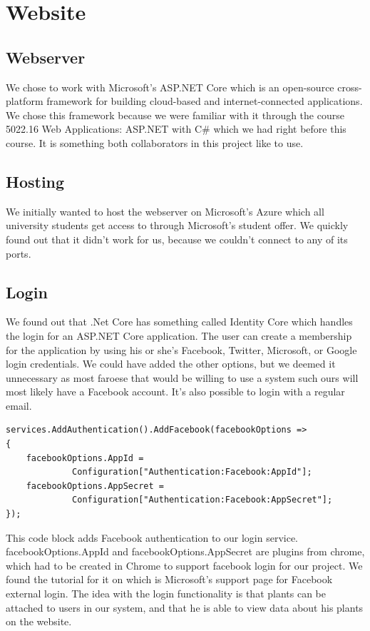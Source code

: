 \documentclass[a4paper,12pt,twoside,openright,titlepage]{book}
\begin{document}
\chapter{Website}
\section*{Webserver}
We chose to work with Microsoft's ASP.NET Core which is an open-source cross-platform framework for building cloud-based and internet-connected applications. We chose this framework because we were familiar with it through the course 5022.16 Web Applications: ASP.NET with C\# which we had right before this course. It is something both collaborators in this project like to use. 

\section{Hosting}
We initially wanted to host the webserver on Microsoft's Azure which all university students get access to through Microsoft's student offer. We quickly found out that it didn't work for us, because we couldn't connect to any of its ports. 

\section{Login}
We found out that .Net Core has something called Identity Core\cite{Identity} which handles the login for an ASP.NET Core application. The user can create a membership for the application by using his or she's  Facebook, Twitter, Microsoft, or Google login credentials. We could have added the other options, but we deemed it unnecessary as most faroese that would be willing to use a system such ours will most likely have a Facebook account. It's also possible to login with a regular email.

\begin{lstlisting}[language=CSharp] 
services.AddAuthentication().AddFacebook(facebookOptions =>
{
	facebookOptions.AppId =
			 Configuration["Authentication:Facebook:AppId"];
	facebookOptions.AppSecret =
			 Configuration["Authentication:Facebook:AppSecret"];
});
\end{lstlisting}

This code block adds Facebook authentication to our login service. facebookOptions.AppId and facebookOptions.AppSecret are plugins from chrome, which had to be created in Chrome to support facebook login for our project. We found the tutorial for it on \cite{FacebookLogin} which is Microsoft's support page for Facebook external login. The idea with the login functionality is that plants can be attached to users in our system, and that he is able to view data about his plants on the website.
\end{document}
